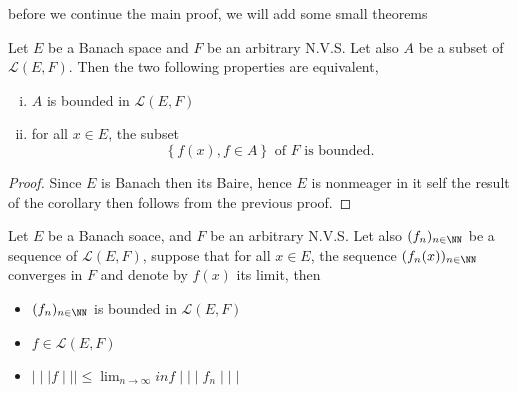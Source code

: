 before we continue the main proof, we will add some
small theorems
\begin{theorem}[1]
	Let $E $ be a Banach space
	and $F $ be an arbitrary N.V.S. Let also
	$A $ be a subset of $\mathcal{L} (E,F)  $.
	Then the two following properties are equivalent, 
	\begin{enumerate}[(i)]
	\item $A $ is bounded in $\mathcal{L} (E,F)  $ 
	\item for all $ x \in E $, the subset 
		\[
		\left\{ f(x) , f \in A \right\} \text{ of } 
		F \text{ is bounded. } 
		\]
	\end{enumerate}
\end{theorem}
\begin{proof}
Since $E $ is Banach then its Baire, 
hence $E $ is nonmeager in it self
the result of the corollary then follows
from the previous proof.
\end{proof}
\begin{theorem}[2]
	Let $E $ be a Banach soace, and $F $ be 
	an arbitrary N.V.S. Let also
	$(f_{n}) _{n \in \NN} $  
	be a sequence of $\mathcal{L} (E,F)  $, 
	suppose that for all $x \in E $, the sequence
	$(f_{n}(x) )_{n \in \NN}  $  converges in $F $ 
	and denote by $f(x)  $  its limit, then 
	\begin{itemize}
	\item 
	$(f_{n})_{n \in \NN}   $  is bounded in 
	$\mathcal{L} (E,F)  $
	\item  
	$f \in  \mathcal{L} (E,F)  $ 
	\item  
	$\mid \mid \mid  f \mid \mid \mid \leq 
	\lim_{n \to \infty} inf \mid \mid \mid  f_{n} \mid \mid \mid $ 
	\end{itemize}
\end{theorem}
